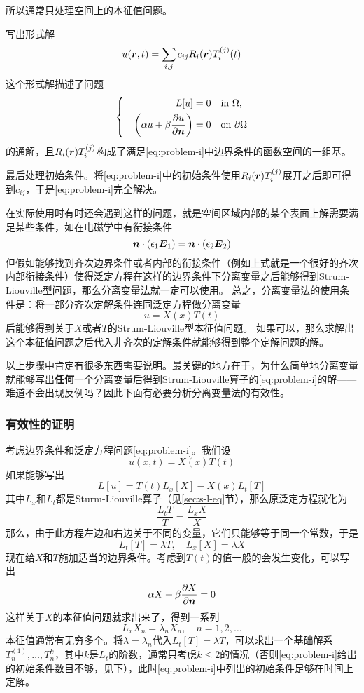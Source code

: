 \documentclass[UTF8]{ctexart}
\newenvironment{bigcase}{\left\{ \quad \begin{aligned}}{\end{aligned}\right.}
\renewenvironment{enumerate}{\begin{compactenum}}{\end{compactenum}}
\begin{document}
\begin{enumerate}
{    所以通常只处理空间上的本征值问题。
    }%
    \item 写出形式解
    \begin{equation}
        u(\vb*{r}, t) = \sum_{i,j} c_{ij} R_i(\vb*{r}) T_i^{(j)}(t)
    \end{equation}
    这个形式解描述了问题
    \begin{equation}
        \begin{bigcase}
            L[u] &= 0 \quad \text{in $\Omega$}, \\
            \left(\alpha u + \beta \pdv{u}{\vb*{n}} \right) &= 0 \quad \text{on $\partial \Omega$}
        \end{bigcase}
        \label{eq:homogeneous-without-initial-condition}
    \end{equation}
    的通解，且$R_i(\vb*{r}) T_i^{(j)}$构成了满足\eqref{eq:problem-i}中边界条件的函数空间的一组基。
    \item 最后处理初始条件。将\eqref{eq:problem-i}中的初始条件使用$R_i(\vb*{r}) T_i^{(j)}$展开之后即可得到$c_{ij}$，于是\eqref{eq:problem-i}完全解决。
\end{enumerate}

在实际使用时有时还会遇到这样的问题，就是空间区域内部的某个表面上解需要满足某些条件，如在电磁学中有衔接条件
\[
    \vb*{n} \cdot (\epsilon_1 \vb*{E}_1) = \vb*{n} \cdot (\epsilon_2 \vb*{E}_2)
\]
但假如能够找到齐次边界条件或者内部的衔接条件（例如上式就是一个很好的齐次内部衔接条件）使得泛定方程在这样的边界条件下分离变量之后能够得到Strum-Liouville型问题，那么分离变量法就一定可以使用。
总之，分离变量法的使用条件是：将一部分齐次定解条件连同泛定方程做分离变量
\[
    u = X(x) T(t)
\]
后能够得到关于$X$或者$T$的Strum-Liouville型本征值问题。
如果可以，那么求解出这个本征值问题之后代入非齐次的定解条件就能够得到整个定解问题的解。

以上步骤中肯定有很多东西需要说明。最关键的地方在于，为什么简单地分离变量就能够写出\textbf{任何}一个分离变量后得到Strum-Liouville算子的\eqref{eq:problem-i}的解——难道不会出现反例吗？因此下面有必要分析分离变量法的有效性。

\subsubsection{有效性的证明}
考虑边界条件和泛定方程问题\eqref{eq:problem-i}。我们设
\[
    u(x, t) = X(x) T(t)
\]
如果能够写出
\[
    L[u] = T(t) L_x [X] - X(x) L_t [T]
\]
其中$L_x$和$L_t$都是Sturm-Liouville算子（见\ref{sec:s-l-eq}节），那么原泛定方程就化为
\[
    \frac{L_t T}{T} = \frac{L_x X}{X}
\]
那么，由于此方程左边和右边关于不同的变量，它们只能够等于同一个常数，于是
\[
    L_t [T] = \lambda T, \quad L_x [X] = \lambda X
\]
现在给$X$和$T$施加适当的边界条件。考虑到$T(t)$的值一般的会发生变化，可以写出
\[
    \alpha X + \beta \pdv{X}{\vb*{n}} = 0
\]
这样关于$X$的本征值问题就求出来了，得到一系列
\[
    L_x X_n = \lambda_n X_n, \quad n = 1, 2, \ldots
\]
本征值通常有无穷多个。将$\lambda = \lambda_n$代入$L_t [T] = \lambda T$，可以求出一个基础解系$T_n^{(1)}, \ldots, T_n^{k}$，其中$k$是$L_t$的阶数，通常只考虑$k\leq 2$的情况（否则\eqref{eq:problem-i}给出的初始条件数目不够，见下），此时\eqref{eq:problem-i}中列出的初始条件足够在时间上定解。
\end{document}
